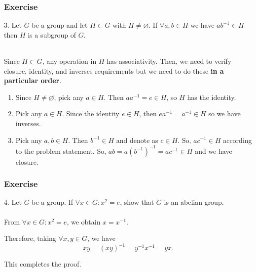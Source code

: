 \documentclass{beamer}
\begin{document}
\begin{frame}
    \frametitle{Exercise}
    3. Let $G$ be a group and let $H \subset G$ with $H \neq \varnothing$. 
    If $\forall a, b \in H$ we have $ab^{-1} \in H$ then $H$ is a subgroup of $G$.
    
    \vv{}\\
    \hh Since $H \subset G$, any operation in $H$ has associativity. Then, we need to verify closure, identity, and inverses requirements but we need to
    do these \textbf{in a particular order}. 
    \begin{enumerate}
        \item  Since $H \neq \varnothing$, pick any $a \in H$. Then $aa^{-1} = e \in H$, so $H$ has the identity.
        \item Pick any $a \in H$. Since the identity $e \in H$, then $ea^{-1} = a^{-1} \in H$ so we have inverses. 
        \item Pick any $a, b \in H$. Then $b^{-1} \in H$ and denote as $c \in H$. So, $ac^{-1} \in H$ according to the problem statement. So, $ab = a(b^{-1})^{-1} = ac^{-1} \in H$ and we have closure.	
    \end{enumerate}
\end{frame}
\begin{frame}
    \frametitle{Exercise}
    4. Let $G$ be a group. If $\forall x \in G : x^2 = e$, show that $G$ is an abelian group.
    \\ \vv
    \\ \vv
    From $\forall x \in G : x^2 = e$, we obtain $x = x^{-1}$.
    \par Therefore, taking $\forall x,y \in G$, we have $$xy = (xy)^{-1} = y^{-1}x^{-1} = yx.$$
    \par This completes the proof.
    
\end{frame}
\end{document}
